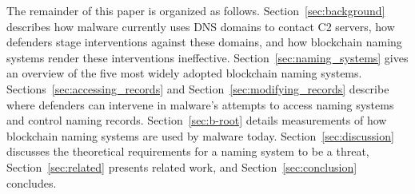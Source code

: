 The remainder of this paper is organized as follows. 
Section~\ref{sec:background} describes how malware currently 
uses DNS domains to contact C2 servers, how defenders 
stage interventions against these domains, and how blockchain 
naming systems render these interventions ineffective. 
Section~\ref{sec:naming_systems} gives an overview of the 
five most widely adopted blockchain naming systems. 
Sections~\ref{sec:accessing_records} and 
Section~\ref{sec:modifying_records} describe where defenders 
can intervene in malware's attempts to access naming systems 
and control naming records. Section~\ref{sec:b-root} details 
measurements of how blockchain naming systems are used by 
malware today. Section~\ref{sec:discussion} discusses the 
theoretical requirements for a naming system to be a threat, 
Section~\ref{sec:related} presents related work, and 
Section~\ref{sec:conclusion} concludes.